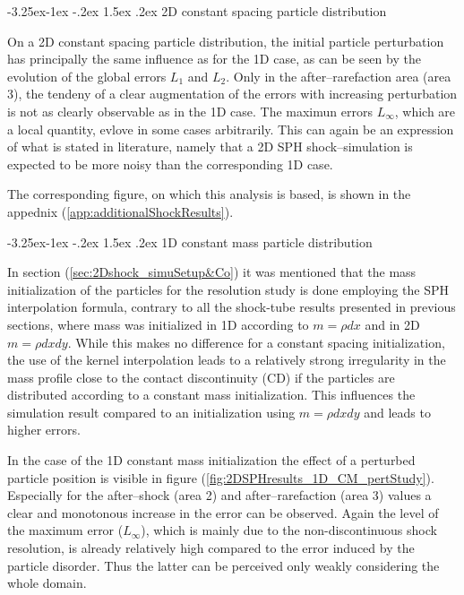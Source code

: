 \documentclass[11pt,a4paper,twoside]{report}
\makeatletter
\renewcommand\paragraph{\@startsection{paragraph}{4}{\z@}%
  {-3.25ex\@plus -1ex \@minus -.2ex}%
  {1.5ex \@plus .2ex}%
  {\normalfont\normalsize\bfseries}}
\makeatother
\begin{document}
\paragraph{2D constant spacing particle distribution}

On a 2D constant spacing particle distribution, the initial particle perturbation has principally the same influence as for the 1D case, as can be seen by the evolution of the global errors $L_1$ and $L_2$. Only in the after--rarefaction area (area 3), the tendeny of a clear augmentation of the errors with increasing perturbation is not as  clearly observable as in the 1D case. The maximun errors $L_\infty$, which are a local quantity, evlove in some cases arbitrarily. This can again be an expression of what is stated in literature, namely that a 2D SPH shock--simulation is expected to be more noisy than the corresponding 1D case. 

The corresponding figure, on which this analysis is based, is shown in the appednix (\ref{app:additionalShockResults}).


\paragraph{1D constant mass particle distribution}

In section (\ref{sec:2Dshock_simuSetup&Co}) it was mentioned that the mass initialization of the particles for the resolution study is done employing the SPH interpolation formula, contrary to all the shock-tube results presented in previous sections, where mass was initialized in 1D according to $m=\rho dx$ and in 2D $m=\rho dx dy$. While this makes no difference for a constant spacing initialization, the use of the kernel interpolation leads to a relatively strong irregularity in the mass profile close to the contact discontinuity (CD) if the particles are distributed according to a constant mass initialization. This  influences the simulation result compared to an initialization using $m=\rho dx dy$ and leads to higher errors.  


In the case of the 1D constant mass initialization the effect of a perturbed particle position is visible in figure (\ref{fig:2DSPHresults_1D_CM_pertStudy}). 
Especially for the after--shock (area 2) and after--rarefaction (area 3) values a clear and monotonous increase in the error can be observed. Again the level of the maximum error ($L_\infty$), which is mainly due to the non-discontinuous shock resolution, is already relatively high compared to the error induced by the particle disorder. Thus the latter can be perceived only weakly considering the whole domain.
\end{document}
